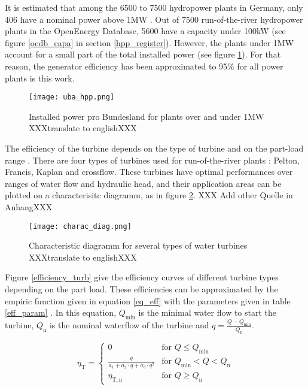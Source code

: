 It is estimated that among the 6500 to 7500 hydropower plants in Germany, only 406 have a nominal power above 1MW \cite{uba_wasserkraft}. Out of 7500 run-of-the-river hydropower plants in the OpenEnergy Database, 5600 have a capacity under 100kW (see figure \ref{oedb_capa} in section \ref{hpp_register}).  However, the plants under 1MW account for a small part of the total installed power (see figure \ref{uba_hpp}). For that reason, the generator efficiency has been approximated to 95\% for all power plants is this work.

\begin{figure}[H]
\texttt{[image: uba\_hpp.png]}
\caption[Installed power pro Bundesland for plants over and under 1MW]{Installed power pro Bundesland for plants over and under 1MW \cite{uba_wasserkraft} XXXtranslate to englishXXX}
\centering
\label{uba_hpp}
\end{figure}

The efficiency of the turbine depends on the type of turbine and on the part-load range \cite{quaschning}\cite{pacer}. There are four types of turbines used for run-of-the-river plants : Pelton, Francis, Kaplan and crossflow. These turbines have optimal performances over ranges of water flow and hydraulic head, and their application areas can be plotted on a characterisitc diagramm, as in figure \ref{charac_diag}. XXX Add other Quelle in AnhangXXX

\begin{figure}[H]
\texttt{[image: charac\_diag.png]}
\caption[Characteristic diagramm for several types of water turbines]{Characteristic diagramm for several types of water turbines \cite{wiki_WK} XXXtranslate to englishXXX}
\centering
\label{charac_diag}
\end{figure}

Figure \ref{efficiency_turb} give the efficiency curves of different turbine types depending on the part load. These efficiencies can be approximated by the empiric function given in equation \ref{eq_eff} with the parameters given in table \ref{eff_param} \cite{quaschning}. In this equation, $Q_\mathrm{min}$ is the minimal water flow to start the turbine, $Q_\mathrm{n}$ is the nominal waterflow of the turbine and $q=\frac{Q-Q_\mathrm{min}}{Q_\mathrm{n}}$.

\begin{equation}
 \label{eq_eff}
\eta_\mathrm{T}= \left\{
    \begin{array}{ll}
	0 & \mbox{for } Q \leq Q_\mathrm{min}\\
        \frac{q}{a_\mathrm{1}+a_\mathrm{2} \cdot q + a_\mathrm{3} \cdot q^2} & \mbox{for } Q_\mathrm{min}<Q<Q_\mathrm{n} \\
        \eta_\mathrm{T,n} & \mbox{for } Q \geq Q_\mathrm{n}
    \end{array}
\right.
\end{equation}


